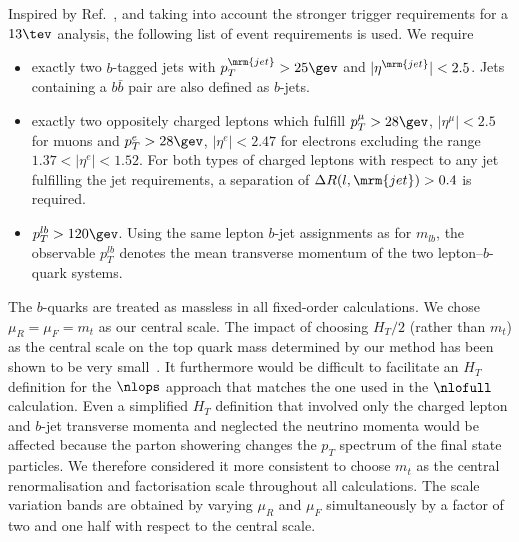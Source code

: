 Inspired by Ref.~\cite{Aaboud:2016igd}, and taking into account the
stronger trigger requirements for a $13\tev$ analysis, the following list
of event requirements is used. We require
\begin{itemize}
\item
  exactly two $b$-tagged jets with $p_T^\mrm{jet}>25\gev$ and
  $|\eta^\mrm{jet}|<2.5$. Jets containing a $b\bar{b}$ pair are also
  defined as $b$-jets.
\item
  exactly two oppositely charged leptons which fulfill
  $p_T^{\mu}>28\gev$, $|\eta^{\mu}|<2.5$ for muons and
  $p_T^{e}>28\gev$, $|\eta^{e}|<2.47$ for electrons excluding the
  range $1.37<|\eta^{e}|<1.52$.
  For both types of charged leptons with respect to any jet fulfilling
  the jet requirements, a separation of $\Delta R(l,\mrm{jet})>0.4$ is
  required.
\item
  $p_{T}^{lb}>120\gev$. Using the same lepton $b$-jet assignments as
  for $m_{lb}$, the observable $p_{T}^{lb}$ denotes the mean
  transverse momentum of the two lepton--$b$-quark systems.
\end{itemize}


The $b$-quarks are treated as massless in all fixed-order calculations.
We chose $\mu_R=\mu_F=m_{t}$ as our central scale. The impact of
choosing $H_T/2$ (rather than $m_t$) as the central scale on the top
quark mass determined by our method has been shown to be very
small~\cite{Heinrich:2013qaa}. It furthermore would be difficult to
facilitate an $H_T$ definition for the $\nlops$ approach that matches
the one used in the $\nlofull$ calculation. Even a simplified
$H_T$ definition that involved only the charged lepton and $b$-jet
transverse momenta and neglected the neutrino momenta would be
affected because the parton showering changes the $p_T$ spectrum of
the final state particles. We therefore considered it more consistent
to choose $m_t$ as the central renormalisation and factorisation scale
throughout all calculations. The scale variation bands are obtained by
varying $\mu_R$ and $\mu_F$ simultaneously by a factor of two and one
half with respect to the central scale.

